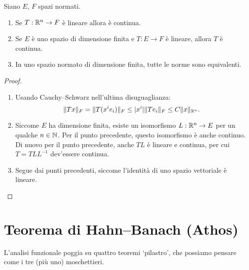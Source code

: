 \begin{lemma}
	Siano $E$, $F$ spazi normati.
	\begin{enumerate}
		\item Se $T : \mathbb{R}^n \to F$ è lineare allora è continua.
		\item Se $E$ è uno spazio di dimensione finita e $T : E \to F$ è lineare, allora $T$ è continua.
		\item In uno spazio normato di dimensione finita, tutte le norme sono equivalenti.
	\end{enumerate}
\end{lemma}
\begin{proof}
	\leavevmode
	\begin{enumerate}
		\item Usando Cauchy--Schwarz nell'ultima disuguaglianza:
		\begin{equation*}
			\|Tx\|_F = \|T(x^i e_i)\|_F \leq |x^i|\|Te_i\|_F \leq C \|x\|_{\mathbb{R}^n}.
		\end{equation*}
		\item Siccome $E$ ha dimensione finita, esiste un isomorfismo $L:\mathbb{R}^n \to E$ per un qualche $n \in \mathbb{N}$. Per il punto precedente, questo isomorfismo è anche continuo.
		Di nuovo per il punto precedente, anche $TL$ è lineare e continua, per cui $T = TLL^{-1}$ dev'essere continua.
		\item Segue dai punti precedenti, siccome l'identità di uno spazio vettoriale è lineare.
	\end{enumerate}
\end{proof}

\section{Teorema di Hahn--Banach (Athos)}
L'analisi funzionale poggia su quattro teoremi `pilastro', che possiamo pensare come i tre (più uno) moschettieri.

